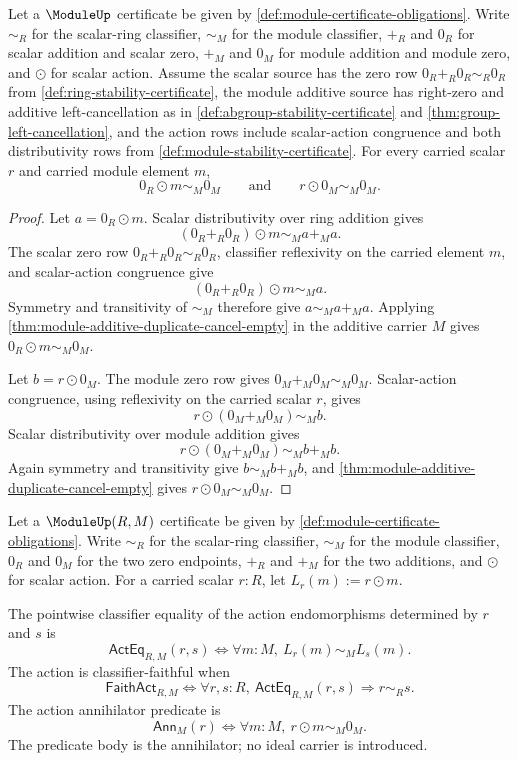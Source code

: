 \begin{theorem}
\label{thm:module-zero-action-annihilation}
Let a $\ModuleUp$ certificate be given by \autoref{def:module-certificate-obligations}. Write $\sim_R$ for the scalar-ring classifier, $\sim_M$ for the module classifier, $+_R$ and $0_R$ for scalar addition and scalar zero, $+_M$ and $0_M$ for module addition and module zero, and $\odot$ for scalar action. Assume the scalar source has the zero row $0_R+_R0_R\sim_R0_R$ from \autoref{def:ring-stability-certificate}, the module additive source has right-zero and additive left-cancellation as in \autoref{def:abgroup-stability-certificate} and \autoref{thm:group-left-cancellation}, and the action rows include scalar-action congruence and both distributivity rows from \autoref{def:module-stability-certificate}. For every carried scalar $r$ and carried module element $m$,
$$
0_R\odot m\sim_M0_M
\qquad\text{and}\qquad
r\odot0_M\sim_M0_M.
$$
\end{theorem}
\begin{proof}
Let $a=0_R\odot m$. Scalar distributivity over ring addition gives
$$
(0_R+_R0_R)\odot m\sim_M a+_M a.
$$
The scalar zero row $0_R+_R0_R\sim_R0_R$, classifier reflexivity on the carried element $m$, and scalar-action congruence give
$$
(0_R+_R0_R)\odot m\sim_M a.
$$
Symmetry and transitivity of $\sim_M$ therefore give $a\sim_M a+_M a$. Applying \autoref{thm:module-additive-duplicate-cancel-empty} in the additive carrier $M$ gives $0_R\odot m\sim_M0_M$.

Let $b=r\odot0_M$. The module zero row gives $0_M+_M0_M\sim_M0_M$. Scalar-action congruence, using reflexivity on the carried scalar $r$, gives
$$
r\odot(0_M+_M0_M)\sim_M b.
$$
Scalar distributivity over module addition gives
$$
r\odot(0_M+_M0_M)\sim_M b+_M b.
$$
Again symmetry and transitivity give $b\sim_M b+_M b$, and \autoref{thm:module-additive-duplicate-cancel-empty} gives $r\odot0_M\sim_M0_M$.
\end{proof}

\begin{definition}
\label{def:module-action-faithful-annihilator}
Let a $\ModuleUp(R,M)$ certificate be given by \autoref{def:module-certificate-obligations}. Write $\sim_R$ for the scalar-ring classifier, $\sim_M$ for the module classifier, $0_R$ and $0_M$ for the two zero endpoints, $+_R$ and $+_M$ for the two additions, and $\odot$ for scalar action. For a carried scalar $r:R$, let $L_r(m):=r\odot m$.

The pointwise classifier equality of the action endomorphisms determined by $r$ and $s$ is
$$
\mathsf{ActEq}_{R,M}(r,s)\Longleftrightarrow
\forall m:M,\ L_r(m)\sim_M L_s(m).
$$
The action is classifier-faithful when
$$
\mathsf{FaithAct}_{R,M}\Longleftrightarrow
\forall r,s:R,\ \mathsf{ActEq}_{R,M}(r,s)\Longrightarrow r\sim_R s.
$$
The action annihilator predicate is
$$
\mathsf{Ann}_M(r)\Longleftrightarrow
\forall m:M,\ r\odot m\sim_M 0_M.
$$
The predicate body is the annihilator; no ideal carrier is introduced.
\end{definition}

